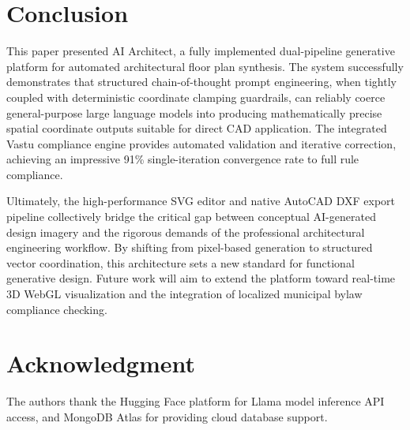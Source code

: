 \documentclass[10pt, twocolumn, letterpaper]{article}
\begin{document}
\section{Conclusion}

This paper presented AI Architect, a fully implemented dual-pipeline
generative platform for automated architectural floor plan synthesis. The
system successfully demonstrates that structured chain-of-thought prompt
engineering, when tightly coupled with deterministic coordinate clamping
guardrails, can reliably coerce general-purpose large language models into
producing mathematically precise spatial coordinate outputs suitable for direct
CAD application. The integrated Vastu compliance engine provides automated
validation and iterative correction, achieving an impressive 91\%
single-iteration convergence rate to full rule compliance.

Ultimately, the high-performance SVG editor and native AutoCAD DXF export
pipeline collectively bridge the critical gap between conceptual AI-generated
design imagery and the rigorous demands of the professional architectural
engineering workflow. By shifting from pixel-based generation to structured
vector coordination, this architecture sets a new standard for functional
generative design. Future work will aim to extend the platform toward real-time
3D WebGL visualization and the integration of localized municipal bylaw
compliance checking.

\section*{Acknowledgment}
The authors thank the Hugging Face platform for Llama model inference API
access, and MongoDB Atlas for providing cloud database support.
\end{document}
